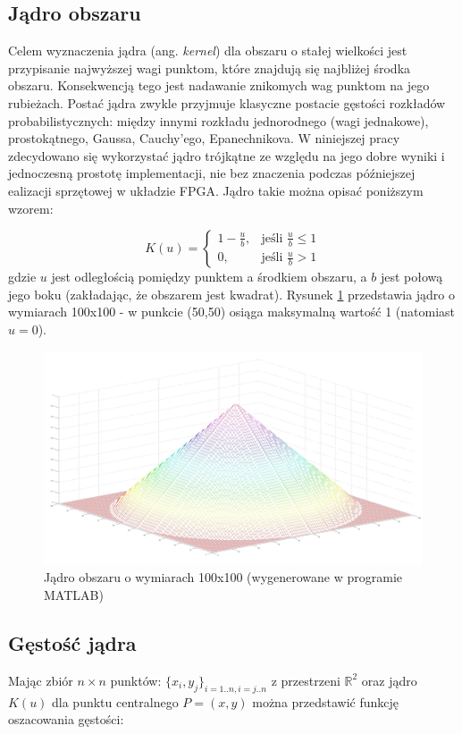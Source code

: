 \subsection{Jądro obszaru}
Celem wyznaczenia jądra (ang. \textit{kernel}) dla obszaru o stałej wielkości jest przypisanie najwyższej wagi punktom, które znajdują się najbliżej środka obszaru. Konsekwencją tego jest nadawanie znikomych wag punktom na jego rubieżach. Postać jądra zwykle przyjmuje klasyczne postacie gęstości rozkładów probabilistycznych: między innymi rozkładu jednorodnego (wagi jednakowe), prostokątnego, Gaussa, Cauchy'ego, Epanechnikova. W niniejszej pracy zdecydowano się wykorzystać jądro trójkątne ze względu na jego dobre wyniki i jednoczesną prostotę implementacji, nie bez znaczenia podczas późniejszej ealizacji sprzętowej w układzie FPGA. Jądro takie można opisać poniższym wzorem:

\begin{equation}
\label{eq:ms3}
K(u)=\begin{cases}
1-\frac{u}{b}, & \text{jeśli }\frac{u}{b}\leq 1 \\
0, & \text{jeśli }\frac{u}{b} > 1
\end{cases}
\end{equation}
gdzie $u$ jest odległością pomiędzy punktem a środkiem obszaru, a $b$ jest połową jego boku (zakładając, że obszarem jest kwadrat). Rysunek \ref{fig:kernel} przedstawia jądro o wymiarach 100x100 - w punkcie (50,50) osiąga maksymalną wartość 1 (natomiast $u=0$).
\begin{figure}[h]
	\centering
	\includegraphics[width=16cm]{2_kernel.jpg}
	\caption{Jądro obszaru o wymiarach 100x100 (wygenerowane w programie MATLAB)}
	\label{fig:kernel}
\end{figure}

\subsection{Gęstość jądra}
Mając zbiór $n\times n$ punktów: $\{x_{i},y_{j}\}_{i=1..n,i=j..n}$ z przestrzeni $\mathbb{R}^2$ oraz jądro $K(u)$ dla punktu centralnego $P=(x,y)$ można przedstawić funkcję oszacowania gęstości:

